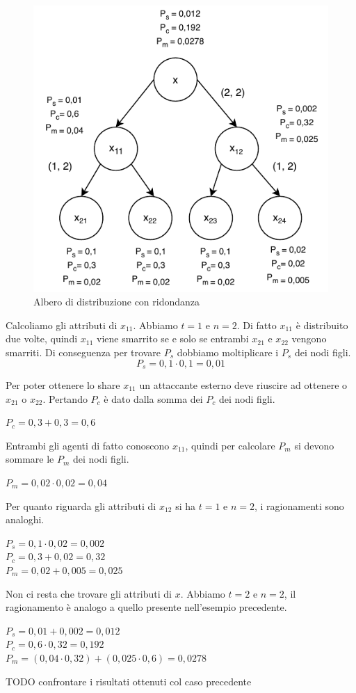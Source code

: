 \begin{figure}[H]
	\centering
	\includegraphics[width=0.6\linewidth]{images/chap_analisi_robustezza/robustezza-2-2.pdf}
	\caption{Albero di distribuzione con ridondanza}
	\label{fig:robustezza-2-2}
\end{figure}

Calcoliamo gli attributi di $ x_{11} $. Abbiamo $ t = 1 $ e $ n = 2 $.
Di fatto $ x_{11} $ è distribuito due volte, quindi
$ x_{11} $ viene smarrito se e solo se entrambi $ x_{21} $ e $ x_{22} $ vengono smarriti.
Di conseguenza per trovare
$ P_s $ dobbiamo moltiplicare i $ P_s $ dei nodi figli.
$$ P_s = 0,1 \cdot 0,1 = 0,01 $$


Per poter ottenere lo share $ x_{11} $ un attaccante esterno deve riuscire ad ottenere
o $ x_{21} $ o $ x_{22} $. Pertando $ P_c $ è dato dalla somma dei $ P_c $ dei nodi figli.
\begin{tightcenter}
	$ P_c = 0,3 + 0,3 = 0,6 $
\end{tightcenter}

Entrambi gli agenti di fatto conoscono $ x_{11} $, quindi per calcolare $ P_m $ si devono
sommare le $ P_m $ dei nodi figli.
\begin{tightcenter}
	$ P_m = 0,02 \cdot 0,02 = 0,04$
\end{tightcenter}

Per quanto riguarda gli attributi di $ x_{12} $ si ha $ t = 1 $ e $ n = 2 $,
i ragionamenti sono analoghi.
\begin{tightcenter}
	$ P_s = 0,1 \cdot 0,02 = 0,002 $\\
	$ P_c = 0,3 + 0,02 = 0,32 $\\
	$ P_m = 0,02 + 0,005 = 0,025 $
\end{tightcenter}

Non ci resta che trovare gli attributi di $ x $.
Abbiamo $ t = 2 $ e $ n = 2 $, il ragionamento è analogo a quello presente nell'esempio precedente.
\begin{tightcenter}
	$ P_s = 0,01 + 0,002 = 0,012 $\\
	$ P_c = 0,6 \cdot 0,32 = 0,192 $\\
	$ P_m = (0,04 \cdot 0,32) + (0,025 \cdot 0,6) = 0,0278 $\\
\end{tightcenter}
TODO confrontare i risultati ottenuti col caso precedente


